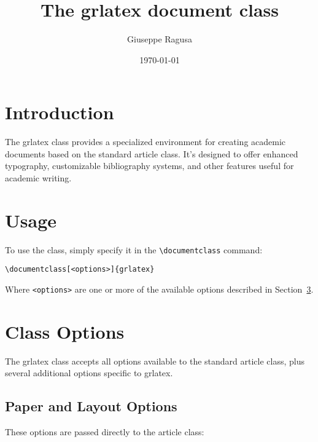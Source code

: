 \documentclass{ltxdoc}
\title{The \textsf{grlatex} document class}
\author{Giuseppe Ragusa}
\date{\today}
\begin{document}
\maketitle

\tableofcontents

\section{Introduction}

The \textsf{grlatex} class provides a specialized environment for creating academic documents based on the standard \textsf{article} class. It's designed to offer enhanced typography, customizable bibliography systems, and other features useful for academic writing.

\section{Usage}

To use the class, simply specify it in the \verb|\documentclass| command:

\begin{lstlisting}
\documentclass[<options>]{grlatex}
\end{lstlisting}

Where \verb|<options>| are one or more of the available options described in Section~\ref{sec:options}.

\section{Class Options}
\label{sec:options}

The \textsf{grlatex} class accepts all options available to the standard \textsf{article} class, plus several additional options specific to \textsf{grlatex}.

\subsection{Paper and Layout Options}

These options are passed directly to the \textsf{article} class:
\end{document}
